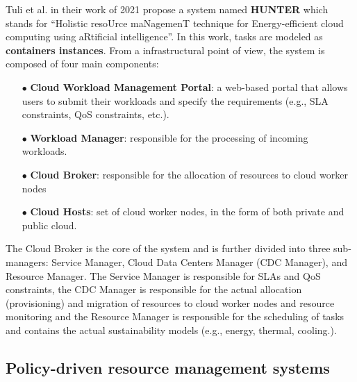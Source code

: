 Tuli et al. in their work of 2021 \cite{TULI2022111124} propose a system named \textbf{HUNTER} which stands for ``Holistic resoUrce
maNagemenT technique for Energy-efficient cloud computing using aRtificial intelligence''. 
In this work, tasks are modeled as \textbf{containers instances}.
From a infrastructural point of view, the system is composed of four main components:
\begin{itemize}[itemsep=0.2pt, topsep=1pt]
    \item[$\bullet$] \textbf{Cloud Workload Management Portal}: a web-based portal that allows users to submit their workloads and specify the requirements (e.g., SLA constraints, QoS constraints, etc.).
    \item[$\bullet$] \textbf{Workload Manager}: responsible for the processing of incoming workloads.
    \item[$\bullet$] \textbf{Cloud Broker}: responsible for the allocation of resources to cloud worker nodes
    \item[$\bullet$] \textbf{Cloud Hosts}: set of cloud worker nodes, in the form of both private and public cloud.
\end{itemize}
The Cloud Broker is the core of the system and is further divided into three sub-managers: Service Manager, Cloud Data Centers Manager (CDC Manager), and Resource Manager.
The Service Manager is responsible for SLAs and QoS constraints, the CDC Manager is responsible for the actual allocation (provisioning) and migration of resources to cloud worker nodes and resource monitoring and the Resource Manager is responsible for the scheduling of tasks and contains the actual sustainability models (e.g., energy, thermal, cooling.).

\subsection{Policy-driven resource management systems}

